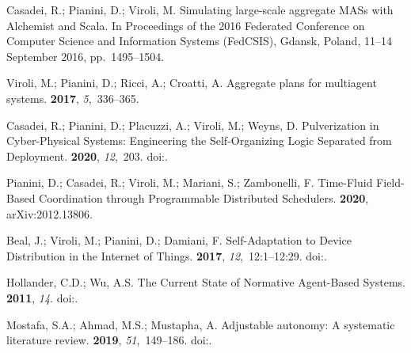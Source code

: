 \documentclass[jsan,article,accept,moreauthors,pdftex]{Definitions/mdpi}
\begin{document}
\begin{thebibliography}{999}
Casadei, R.; Pianini, D.; Viroli, M.
\newblock Simulating large-scale aggregate MASs with Alchemist and Scala.
\newblock  In Proceedings of the 2016 Federated Conference on Computer Science and Information Systems (FedCSIS), Gdansk, Poland, 11--14 September 2016, pp.~1495--1504.

Viroli, M.; Pianini, D.; Ricci, A.; Croatti, A.
\newblock Aggregate plans for multiagent systems.
 {\bf 2017}, {\em
  5},~336--365.

Casadei, R.; Pianini, D.; Placuzzi, A.; Viroli, M.; Weyns, D.
\newblock Pulverization in Cyber-Physical Systems: Engineering the
  Self-Organizing Logic Separated from Deployment.
 {\bf 2020}, {\em 12},~203.
\newblock
  doi:{\href{https://doi.org/10.3390/fi12110203}{}}.

Pianini, D.; Casadei, R.; Viroli, M.; Mariani, S.; Zambonelli, F.
\newblock Time-Fluid Field-Based Coordination through Programmable Distributed
  Schedulers.
 {\bf 2020},  	arXiv:2012.13806.

Beal, J.; Viroli, M.; Pianini, D.; Damiani, F.
\newblock Self-Adaptation to Device Distribution in the Internet of Things.
 {\bf 2017}, {\em
  12},~12:1--12:29.
\newblock
  doi:{\href{https://doi.org/10.1145/3105758}{}}.

Hollander, C.D.; Wu, A.S.
\newblock The Current State of Normative Agent-Based Systems.
 {\bf 2011}, {\em 14}.
\newblock
  doi:{\href{https://doi.org/10.18564/jasss.1750}{}}.

Mostafa, S.A.; Ahmad, M.S.; Mustapha, A.
\newblock Adjustable autonomy: A systematic literature review.
 {\bf 2019}, {\em 51},~149--186.
\newblock
  doi:{\href{https://doi.org/10.1007/s10462-017-9560-8}{}}.


\end{thebibliography}
\end{document}

